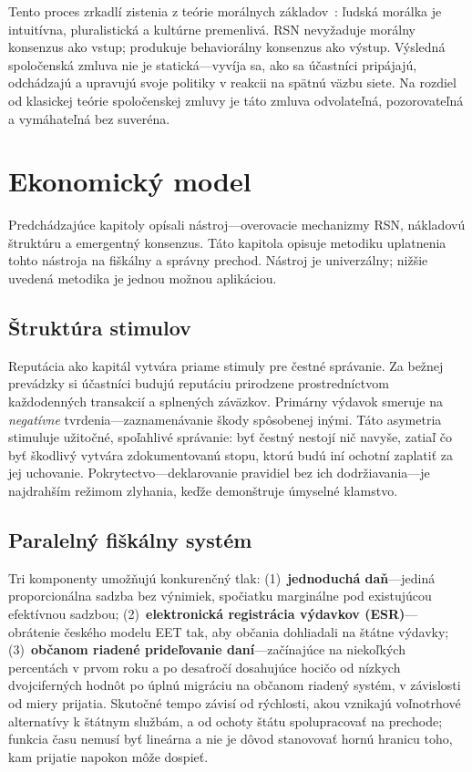 \documentclass[11pt,a4paper,twocolumn]{article}
\begin{document}
Tento proces zrkadlí zistenia z teórie morálnych základov~\cite{haidt2012}: ľudská morálka je intuitívna, pluralistická a kultúrne premenlivá. RSN nevyžaduje morálny konsenzus ako vstup; produkuje behaviorálny konsenzus ako výstup. Výsledná spoločenská zmluva nie je statická---vyvíja sa, ako sa účastníci pripájajú, odchádzajú a upravujú svoje politiky v reakcii na spätnú väzbu siete. Na rozdiel od klasickej teórie spoločenskej zmluvy je táto zmluva odvolateľná, pozorovateľná a vymáhateľná bez suveréna.

\section{Ekonomický model}

Predchádzajúce kapitoly opísali nástroj---overovacie mechanizmy RSN, nákladovú štruktúru a emergentný konsenzus. Táto kapitola opisuje metodiku uplatnenia tohto nástroja na fiškálny a správny prechod. Nástroj je univerzálny; nižšie uvedená metodika je jednou možnou aplikáciou.

\subsection{Štruktúra stimulov}

Reputácia ako kapitál vytvára priame stimuly pre čestné správanie. Za bežnej prevádzky si účastníci budujú reputáciu prirodzene prostredníctvom každodenných transakcií a splnených záväzkov. Primárny výdavok smeruje na \emph{negatívne} tvrdenia---zaznamenávanie škody spôsobenej inými. Táto asymetria stimuluje užitočné, spoľahlivé správanie: byť čestný nestojí nič navyše, zatiaľ čo byť škodlivý vytvára zdokumentovanú stopu, ktorú budú iní ochotní zaplatiť za jej uchovanie. Pokrytectvo---deklarovanie pravidiel bez ich dodržiavania---je najdrahším režimom zlyhania, keďže demonštruje úmyselné klamstvo.

\subsection{Paralelný fiškálny systém}

Tri komponenty umožňujú konkurenčný tlak: (1)~\textbf{jednoduchá daň}---jediná proporcionálna sadzba bez výnimiek, spočiatku marginálne pod existujúcou efektívnou sadzbou; (2)~\textbf{elektronická registrácia výdavkov (ESR)}---obrátenie českého modelu EET tak, aby občania dohliadali na štátne výdavky; (3)~\textbf{občanom riadené prideľovanie daní}---začínajúce na niekoľkých percentách v prvom roku a po desaťročí dosahujúce hocičo od nízkych dvojciferných hodnôt po úplnú migráciu na občanom riadený systém, v závislosti od miery prijatia. Skutočné tempo závisí od rýchlosti, akou vznikajú voľnotrhové alternatívy k štátnym službám, a od ochoty štátu spolupracovať na prechode; funkcia času nemusí byť lineárna a nie je dôvod stanovovať hornú hranicu toho, kam prijatie napokon môže dospieť.
\end{document}
